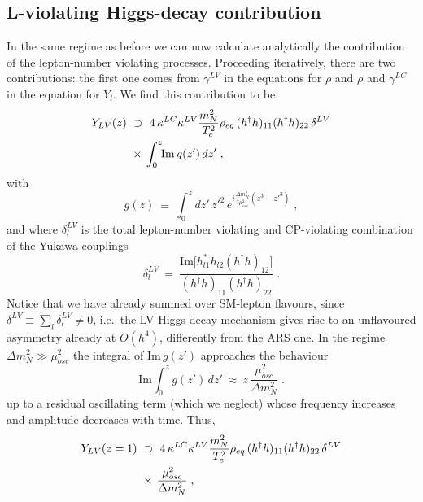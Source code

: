 \documentclass[prd,twocolumn,superscriptaddress,preprintnumbers,nofootinbib,
noshowpacs,groupedaddress]{revtex4-1} %
\begin{document}
\begin{appendix}
\subsection{L-violating Higgs-decay contribution}
In the same regime as before we can now calculate analytically the contribution of the lepton-number violating processes. Proceeding iteratively, there are two contributions: the first one comes from $\gamma^{LV}$ in the equations for $\rho$ and $\bar \rho$ and $\gamma^{LC}$ in the equation for $Y_l$. We find this contribution to be
\begin{align}
Y_{LV}(z) \ &\supset \ 4 \, \kappa^{LC} \kappa^{LV} \frac{m_N^2}{T_c^2} \rho_{eq} \, (h^\dag h)_{11} (h^\dag h)_{22} \, \delta^{LV} \notag\\
&\times \, \int_0^z \!\! \mathrm{Im}\,g(z') \,d z' \;,
\end{align}
with
\begin{equation}
g(z) \ \equiv \ \int_0^z \!\! d z'\, z'^2 \, e^{i \frac{\Delta m_N^2}{3 \mu^2_{osc}}  (z^3 - z'^3)} \;,
\end{equation}
and where $\delta_l^{LV}$ is the total lepton-number violating and CP-violating combination of the Yukawa couplings
\begin{equation}
\delta^{LV}_l \ = \ \frac{\mathrm{Im}\big[h_{l1}^* h_{l2} (h^\dag h)_{12}\big]}{(h^\dag h)_{11} (h^\dag h)_{22}}\;.
\end{equation}
Notice that we have already summed over SM-lepton flavours, since $\delta^{LV} \equiv \sum_l \delta^{LV}_l \neq 0$, i.e.~the LV Higgs-decay mechanism gives rise to an unflavoured asymmetry already at $O(h^4)$, differently from the ARS one.
In the regime $\Delta m_N^2 \gg \mu^2_{osc}$ the integral of $\mathrm{Im}\,g(z')$ approaches the behaviour 
\begin{equation}
 \mathrm{Im} \int_0^{z} \!\! g(z') \, d z' \ \approx \ z \, \frac{\mu^2_{osc}}{\Delta m^2_N} \;.
\end{equation}
up to a residual oscillating term (which we neglect) whose frequency increases and amplitude decreases with time. Thus,
\begin{align}\label{eq:first_contrib}
Y_{LV}(z=1) \ &\supset \ 4 \, \kappa^{LC} \kappa^{LV} \frac{m_N^2}{T_c^2} \rho_{eq} \, (h^\dag h)_{11} (h^\dag h)_{22} \, \delta^{LV} \notag\\
& \times \, \frac{\mu^2_{osc}}{\Delta m^2_N} \;,
\end{align}


\end{appendix}
\end{document}

